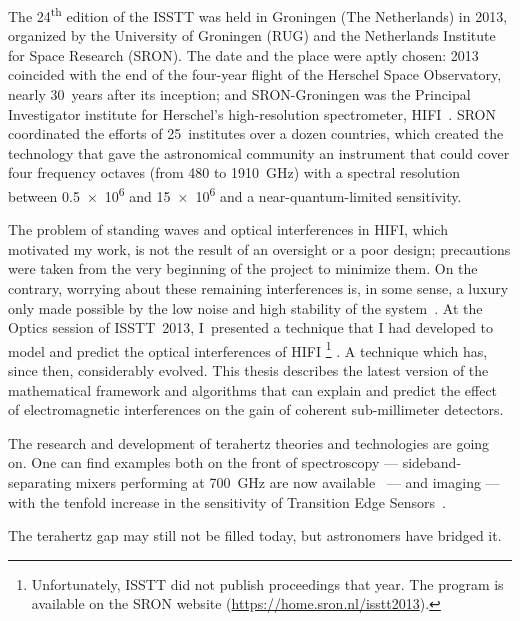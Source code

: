 The 24\textsuperscript{th} edition of the ISSTT was held in Groningen (The Netherlands) in 2013, organized by the University of Groningen (RUG) and the Netherlands Institute for Space Research (SRON).
The date and the place were aptly chosen:
2013 coincided with the end of the four-year flight of the Herschel Space Observatory, nearly \SI{30}{years} after its inception;
and SRON-Groningen was the Principal Investigator institute for Herschel's high-resolution spectrometer, HIFI~\parencite{AA_518_L6}.
SRON coordinated the efforts of 25~institutes over a dozen countries, which created the technology that gave the astronomical community an instrument that could cover four frequency octaves (from \num{480} to \SI{1910}{\giga\hertz}) with a spectral resolution between \num{0.5e6} and \num{15e6} and a near-quantum-limited sensitivity.

The problem of standing waves and optical interferences in HIFI, which motivated my work, is not the result of an oversight or a poor design; precautions were taken from the very beginning of the project to minimize them.
On the contrary, worrying about these remaining interferences is, in some sense, a luxury only made possible by the low noise and high stability of the system~\parencite{AA_537_A17}.
At the Optics session of ISSTT~2013, I~presented a technique that I had developed to model and predict the optical interferences of HIFI%
\footnote{
    Unfortunately, ISSTT did not publish proceedings that year.  The program is available on the SRON website (\url{https://home.sron.nl/isstt2013}).
}%
.
A technique which has, since then, considerably evolved.
This thesis describes the latest version of the mathematical framework and algorithms that can explain and predict the effect of electromagnetic interferences on the gain of coherent sub-millimeter detectors.

The research and development of terahertz theories and technologies are going on.
One can find examples both on the front of spectroscopy
--- sideband-separating mixers performing at \SI{700}{\giga\hertz} are now available~\parencite{khudchenko2011first} --- and imaging --- with the tenfold increase in the sensitivity of Transition Edge Sensors~\parencite{jackson2012spica}.

The terahertz gap may still not be filled today, but astronomers have bridged it.
